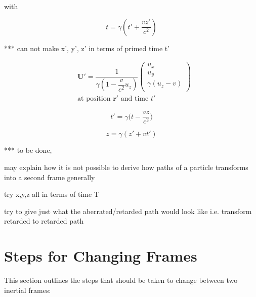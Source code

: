 with

\begin{equation}
	{t} = {\gamma} \left( t' + \dfrac{{v}{z'}}{{c}^2} \right)
\end{equation}

*** can not make x', y', z' in terms of primed time t'

\begin{equation}
		\begin{aligned}
			 & \mathbf{U}{'} = \dfrac{1}{{\gamma}\left(1-\dfrac{v}{{c}^2} {{u}_{z}}\right) }
			\begin{pmatrix}
				{{u}_{x}}                              \\
				{{u}_{y}}                              \\
				{\gamma} \left( {{u}_{z}}- {v} \right) \\
			\end{pmatrix}
			\\
			 & \text{at position ${\mathbf{r}{'}}$ and time ${t{'}}$ }
		\end{aligned}
\end{equation}

\begin{equation}
	{t{'}} = {\gamma} \bigg(t-\frac{{v}{z}}{{c}^2}\bigg)
\end{equation}

\begin{equation}
	{z} = {\gamma} ({z{'}}+{v}{t{'}})
\end{equation}


*** to be done,

may explain how it is not possible to derive how paths of a particle transforms into a second frame generally

try x,y,z all in terms of time T

try to give just what the aberrated/retarded path would look like i.e. transform retarded to retarded path

\section{Steps for Changing Frames} \label{sect: Steps for Changing Frames}

This section outlines the steps that should be taken to change between two inertial frames: \newline

